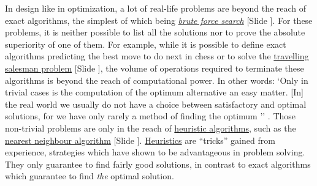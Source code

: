 \documentclass{article}
\newcounter{slide}
\begin{document}
In design like in optimization, a lot of real-life problems are beyond the reach of exact algorithms, the simplest of which being \emph{\href{https://en.wikipedia.org/wiki/Brute-force_search}{brute force search}} {\color{blue}[Slide ]}. For these problems, it is neither possible to list all the solutions nor to prove the absolute superiority of one of them. For example, while it is possible to define exact algorithms predicting the best move to do next in chess or to solve the \href{https://en.wikipedia.org/wiki/Travelling_salesman_problem}{travelling salesman problem} {\color{blue}[Slide ]}, the volume of operations required to terminate these algorithms is beyond the reach of computational power. In other words: `Only in trivial cases is the computation of the optimum alternative an easy matter. [In] the real world we usually do not have a choice between satisfactory and optimal solutions, for we have only rarely a method of finding the optimum '' \cite[p. 118-120]{simon1996sciences}. Those non-trivial problems are only in the reach of \href{https://en.wikipedia.org/wiki/Heuristic_(computer_science)}{heuristic algorithms}, such as the \href{https://en.wikipedia.org/wiki/Nearest_neighbour_algorithm}{nearest neighbour algorithm} {\color{blue}[Slide ]}. \href{https://en.wikipedia.org/wiki/Heuristic}{Heuristics} are ``tricks'' gained from experience, strategies which have shown to be advantageous in problem solving. They only guarantee to find fairly good solutions, in contrast to exact algorithms which guarantee to find \emph{the} optimal solution. 
\end{document}
